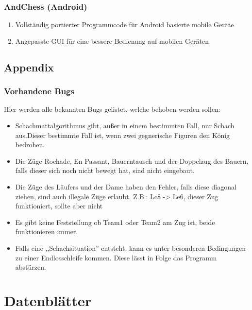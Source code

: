\documentclass[12pt,a4paper]{article}
\begin{document}
\subsubsection{AndChess (Android)}

\begin{enumerate}
	\item{Vollständig portierter Programmcode für Android basierte mobile Geräte}
	\item{Angepasste GUI für eine bessere Bedienung auf mobilen Geräten}
\end{enumerate}

\subsection{Appendix}
\subsubsection{Vorhandene Bugs}

Hier werden alle bekannten Bugs gelistet, welche behoben werden sollen:

\begin{itemize}
	\item{Schachmattalgorithmus gibt, außer in einem bestimmten Fall, nur Schach aus.Dieser bestimmte Fall ist, wenn zwei gegnerische Figuren den König bedrohen.}
	\item{Die Züge Rochade, En Passant, Bauerntausch und der Doppelzug des Bauern, falls dieser sich noch nicht bewegt hat, sind nicht eingebaut.}
	\item{Die Züge des Läufers und der Dame haben den Fehler, falls diese diagonal ziehen, sind auch illegale Züge erlaubt. Z.B.: Lc8 -> Le6, dieser Zug funktioniert, sollte aber nicht}
	\item{Es gibt keine Feststellung ob Team1 oder Team2 am Zug ist, beide funktionieren immer.}
	\item{Falls eine ,,Schachsituation'' entsteht, kann es unter besonderen Bedingungen zu einer Endlosschleife kommen. Diese lässt in Folge das Programm abstürzen.}
\end{itemize}

\renewcommand\thesection{VI}
\section{Datenblätter}
\label{SEC:DATASHEET}
\end{document}
